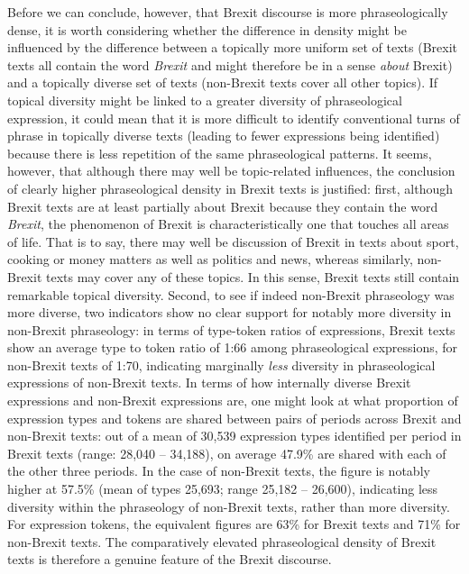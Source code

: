 \documentclass[output=paper]{langscibook}
\begin{document}
Before we can conclude, however, that Brexit discourse is more phraseologically dense, it is worth considering whether the difference in density might be influenced by the difference between a topically more uniform set of texts (Brexit texts all contain the word \textit{Brexit} and might therefore be in a sense \textit{about} Brexit) and a topically diverse set of texts (non-Brexit texts cover all other topics). If topical diversity might be linked to a greater diversity of phraseological expression, it could mean that it is more difficult to identify conventional turns of phrase in topically diverse texts (leading to fewer expressions being identified) because there is less repetition of the same phraseological patterns. It seems, however, that although there may well be topic-related influences, the conclusion of clearly higher phraseological density in Brexit texts is justified: first, although Brexit texts are at least partially about Brexit because they contain the word \textit{Brexit}, the phenomenon of Brexit is characteristically one that touches all areas of life. That is to say, there may well be discussion of Brexit in texts about sport, cooking or money matters as well as politics and news, whereas similarly, non-Brexit texts may cover any of these topics. In this sense, Brexit texts still contain remarkable topical diversity. Second, to see if indeed non-Brexit phraseology was more diverse, two indicators show no clear support for notably more diversity in non-Brexit phraseology: in terms of type-token ratios of expressions, Brexit texts show an average type to token ratio of 1:66 among phraseological expressions, for non-Brexit texts of 1:70, indicating marginally \textit{less} diversity in phraseological expressions of non-Brexit texts. In terms of how internally diverse Brexit expressions and non-Brexit expressions are, one might look at what proportion of expression types and tokens are shared between pairs of periods across Brexit and non-Brexit texts: out of a mean of 30,539 expression types identified per period in Brexit texts (range: 28,040 -- 34,188), on average 47.9\% are shared with each of the other three periods. In the case of non-Brexit texts, the figure is notably higher at 57.5\% (mean of types 25,693; range 25,182 -- 26,600), indicating less diversity within the phraseology of non-Brexit texts, rather than more diversity. For expression tokens, the equivalent figures are 63\% for Brexit texts and 71\% for non-Brexit texts. The comparatively elevated phraseological density of Brexit texts is therefore a genuine feature of the Brexit discourse.
\end{document}
